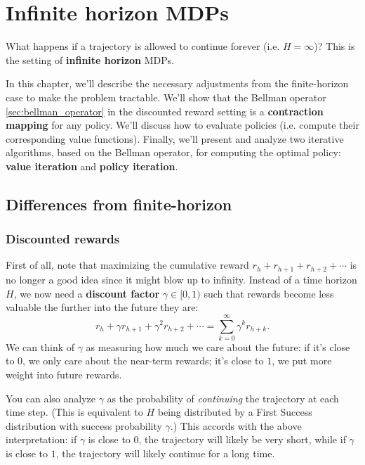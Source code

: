 \documentclass[\main/main]{subfiles}
\begin{document}
\newpage

\section{Infinite horizon MDPs}

What happens if a trajectory is allowed to continue forever (i.e. $H = \infty$)? This is the setting of \textbf{infinite horizon} MDPs.

In this chapter, we'll describe the necessary adjustments from the finite-horizon case to make the problem tractable. We'll show that the Bellman operator \eqref{sec:bellman_operator} in the discounted reward setting is a \textbf{contraction mapping} for any policy. We'll discuss how to evaluate policies (i.e. compute their corresponding value functions). Finally, we'll present and analyze two iterative algorithms, based on the Bellman operator, for computing the optimal policy: \textbf{value iteration} and \textbf{policy iteration}.

\subsection{Differences from finite-horizon}

\subsubsection{Discounted rewards}


First of all, note that maximizing the cumulative reward $r_h + r_{h+1} + r_{h+2} + \cdots$ is no longer a good idea since it might blow up to infinity. Instead of a time horizon $H$, we now need a \textbf{discount factor} $\gamma \in [0, 1)$ such that rewards become less valuable the further into the future they are:
\[
    r_h + \gamma r_{h+1} + \gamma^2 r_{h+2} + \cdots = \sum_{k=0}^\infty \gamma^k r_{h+k}.
\]
We can think of $\gamma$ as measuring how much we care about the future: if it's close to $0$, we only care about the near-term rewards; it's close to $1$, we put more weight into future rewards.

You can also analyze $\gamma$ as the probability of \emph{continuing} the trajectory at each time step. (This is equivalent to $H$ being distributed by a First Success distribution with success probability $\gamma$.) This accords with the above interpretation: if $\gamma$ is close to $0$, the trajectory will likely be very short, while if $\gamma$ is close to $1$, the trajectory will likely continue for a long time.
\end{document}
